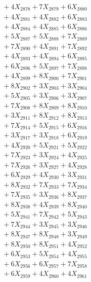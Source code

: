 \documentclass[a4paper,10pt]{article}
\begin{document}
{\begin{align}
&\;  + 4 X_{2878} + 7 X_{2879} + 6 X_{2880} \\[0.3ex]
&\;  + 4 X_{2881} + 4 X_{2882} + 6 X_{2883} \\[0.3ex]
&\;  + 4 X_{2884} + 4 X_{2885} + 6 X_{2886} \\[0.3ex]
&\;  + 5 X_{2887} + 5 X_{2888} + 7 X_{2889} \\[0.5ex]\allowbreak
&\;  + 7 X_{2890} + 4 X_{2891} + 7 X_{2892} \\[0.3ex]
&\;  + 4 X_{2893} + 4 X_{2894} + 6 X_{2895} \\[0.3ex]
&\;  + 6 X_{2896} + 5 X_{2897} + 7 X_{2898} \\[0.3ex]
&\;  + 4 X_{2899} + 8 X_{2900} + 7 X_{2901} \\[0.3ex]
&\;  + 8 X_{2902} + 3 X_{2903} + 3 X_{2904} \\[0.3ex]
&\;  + 5 X_{2905} + 3 X_{2906} + 3 X_{2907} \\[0.3ex]
&\;  + 7 X_{2908} + 8 X_{2909} + 8 X_{2910} \\[0.3ex]
&\;  + 3 X_{2911} + 8 X_{2912} + 8 X_{2913} \\[0.3ex]
&\;  + 7 X_{2914} + 5 X_{2915} + 6 X_{2916} \\[0.3ex]
&\;  + 3 X_{2917} + 3 X_{2918} + 6 X_{2919} \\[0.5ex]\allowbreak
&\;  + 4 X_{2920} + 5 X_{2921} + 5 X_{2922} \\[0.3ex]
&\;  + 7 X_{2923} + 3 X_{2924} + 4 X_{2925} \\[0.3ex]
&\;  + 7 X_{2926} + 3 X_{2927} + 4 X_{2928} \\[0.3ex]
&\;  + 6 X_{2929} + 4 X_{2930} + 3 X_{2931} \\[0.3ex]
&\;  + 8 X_{2932} + 7 X_{2933} + 7 X_{2934} \\[0.3ex]
&\;  + 7 X_{2935} + 3 X_{2936} + 8 X_{2937} \\[0.3ex]
&\;  + 8 X_{2938} + 4 X_{2939} + 8 X_{2940} \\[0.3ex]
&\;  + 5 X_{2941} + 7 X_{2942} + 5 X_{2943} \\[0.3ex]
&\;  + 7 X_{2944} + 3 X_{2945} + 3 X_{2946} \\[0.3ex]
&\;  + 8 X_{2947} + 8 X_{2948} + 3 X_{2949} \\[0.5ex]\allowbreak
&\;  + 8 X_{2950} + 8 X_{2951} + 4 X_{2952} \\[0.3ex]
&\;  + 6 X_{2953} + 5 X_{2954} + 4 X_{2955} \\[0.3ex]
&\;  + 6 X_{2956} + 6 X_{2957} + 7 X_{2958} \\[0.3ex]
&\;  + 6 X_{2959} + 4 X_{2960} + 4 X_{2961} \\[0.3ex]

\end{align}}
\end{document}
